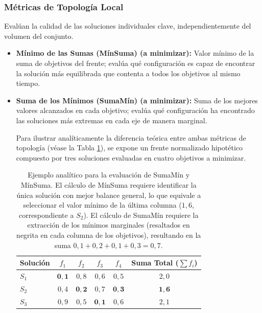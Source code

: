 \subsubsection{Métricas de Topología Local}

Evalúan la calidad de las soluciones individuales clave, independientemente del volumen del conjunto.

\begin{itemize}
    \item \textbf{Mínimo de las Sumas (MínSuma) (a minimizar):} Valor mínimo de la suma de objetivos del frente; evalúa qué configuración es capaz de encontrar la solución más equilibrada que contenta a todos los objetivos al mismo tiempo.

    \item \textbf{Suma de los Mínimos (SumaMín) (a minimizar):} Suma de los mejores valores alcanzados en cada objetivo; evalúa qué configuración ha encontrado las soluciones más extremas en cada eje de manera marginal.

    Para ilustrar analíticamente la diferencia teórica entre ambas métricas de topología (véase la Tabla \ref{tab:metric_sum}), se expone un frente normalizado hipotético compuesto por tres soluciones evaluadas en cuatro objetivos a minimizar.

\begin{table}[H]
    \centering
    \begin{tabular}{lcccc|c}
        \hline
        \textbf{Solución} & \textbf{$f_1$} & \textbf{$f_2$} & \textbf{$f_3$} & \textbf{$f_4$} & \textbf{Suma Total ($\sum f_i$)} \\
        \hline
        $S_1$ & $\mathbf{0{,}1}$ & $0{,}8$ & $0{,}6$ & $0{,}5$ & $2{,}0$ \\
        $S_2$ & $0{,}4$ & $\mathbf{0{,}2}$ & $0{,}7$ & $\mathbf{0{,}3}$ & $\mathbf{1{,}6}$ \\
        $S_3$ & $0{,}9$ & $0{,}5$ & $\mathbf{0{,}1}$ & $0{,}6$ & $2{,}1$ \\
        \hline
    \end{tabular}
    \caption[Evaluación analítica de MínSuma y SumaMín]{Ejemplo analítico para la evaluación de SumaMín y MínSuma. El cálculo de MínSuma requiere identificar la única solución con mejor balance general, lo que equivale a seleccionar el valor mínimo de la última columna ($1{,}6$, correspondiente a $S_2$). El cálculo de SumaMín requiere la extracción de los mínimos marginales (resaltados en negrita en cada columna de los objetivos), resultando en la suma $0{,}1 + 0{,}2 + 0{,}1 + 0{,}3 = 0{,}7$.}
    \label{tab:metric_sum}
\end{table}
\end{itemize}

